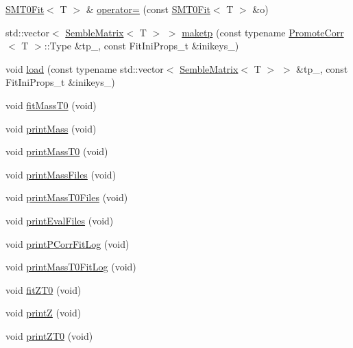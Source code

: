 \begin{DoxyCompactItemize}
\item 
\mbox{\hyperlink{structSEMBLE_1_1SMT0Fit}{S\+M\+T0\+Fit}}$<$ T $>$ \& \mbox{\hyperlink{structSEMBLE_1_1SMT0Fit_a84811b33f6d110453f1ecfbc55a79874}{operator=}} (const \mbox{\hyperlink{structSEMBLE_1_1SMT0Fit}{S\+M\+T0\+Fit}}$<$ T $>$ \&o)
\item 
std\+::vector$<$ \mbox{\hyperlink{structSEMBLE_1_1SembleMatrix}{Semble\+Matrix}}$<$ T $>$ $>$ \mbox{\hyperlink{structSEMBLE_1_1SMT0Fit_a7c06f2de2ced6b21d3a89f233a7237c7}{maketp}} (const typename \mbox{\hyperlink{structSEMBLE_1_1PromoteCorr}{Promote\+Corr}}$<$ T $>$\+::Type \&tp\+\_\+, const Fit\+Ini\+Props\+\_\+t \&inikeys\+\_\+)
\item 
void \mbox{\hyperlink{structSEMBLE_1_1SMT0Fit_a082e12f3695d20ca6acb97d221c30ad1}{load}} (const typename std\+::vector$<$ \mbox{\hyperlink{structSEMBLE_1_1SembleMatrix}{Semble\+Matrix}}$<$ T $>$ $>$ \&tp\+\_\+, const Fit\+Ini\+Props\+\_\+t \&inikeys\+\_\+)
\item 
void \mbox{\hyperlink{structSEMBLE_1_1SMT0Fit_aeeb6d36dda0c5fae9e4bae185f8fadd9}{fit\+Mass\+T0}} (void)
\item 
void \mbox{\hyperlink{structSEMBLE_1_1SMT0Fit_af74d4bc3a5a2da2fa8cd263558acf71a}{print\+Mass}} (void)
\item 
void \mbox{\hyperlink{structSEMBLE_1_1SMT0Fit_a7c2e4c02b18c8566b7609c9f58d467ee}{print\+Mass\+T0}} (void)
\item 
void \mbox{\hyperlink{structSEMBLE_1_1SMT0Fit_a245820fe812f284ef650ae5b1d38a51c}{print\+Mass\+Files}} (void)
\item 
void \mbox{\hyperlink{structSEMBLE_1_1SMT0Fit_a4143346724c18fdd7e82f34f585ed11d}{print\+Mass\+T0\+Files}} (void)
\item 
void \mbox{\hyperlink{structSEMBLE_1_1SMT0Fit_a8d1f484b9943116a221db5955d27bb30}{print\+Eval\+Files}} (void)
\item 
void \mbox{\hyperlink{structSEMBLE_1_1SMT0Fit_a7553e4903f0646d0382dd9335cee52be}{print\+P\+Corr\+Fit\+Log}} (void)
\item 
void \mbox{\hyperlink{structSEMBLE_1_1SMT0Fit_acfb1bcb9dbae9eb752ca05769ab0caa4}{print\+Mass\+T0\+Fit\+Log}} (void)
\item 
void \mbox{\hyperlink{structSEMBLE_1_1SMT0Fit_aae2f42a0b663e58a7458dee2b7a954f2}{fit\+Z\+T0}} (void)
\item 
void \mbox{\hyperlink{structSEMBLE_1_1SMT0Fit_a6bea5ac00bfbb4338655f60bc936c59a}{printZ}} (void)
\item 
void \mbox{\hyperlink{structSEMBLE_1_1SMT0Fit_a3736fc1b96ef2088b5f1235b919010d7}{print\+Z\+T0}} (void)

\end{DoxyCompactItemize}
